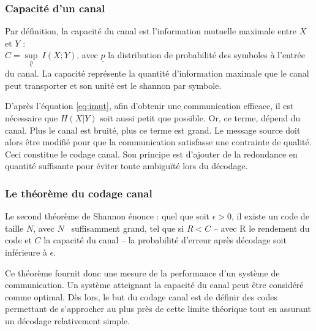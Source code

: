 \subsubsection{Capacité d'un canal}
Par définition, la capacité du canal est l'information mutuelle maximale entre $X$ et $Y$ : \\
$C=\sup\limits_{\underline{p}}\ I(X;Y)$, avec $\underline{p}$ la distribution de probabilité des symboles à l'entrée 
du canal. La capacité représente la quantité d'information maximale que le canal peut transporter et son unité est le 
shannon par symbole.

D'après l'équation \ref{eq:imut}, afin d'obtenir une communication efficace, il est nécessaire que $H(X|Y)$ soit aussi
petit que possible. Or, ce terme, dépend du canal. Plus le canal est bruité, plus ce terme est grand. Le message 
source doit alors être modifié pour que la communication satisfasse une contrainte de qualité. Ceci constitue le codage 
canal. Son principe est d'ajouter de la redondance en quantité suffisante pour éviter toute ambiguïté lors du décodage.

\subsubsection{Le théorème du codage canal}
Le second théorème de Shannon énonce : quel que soit $\epsilon > 0$, il existe un code de taille $N$, avec $N$ \
suffisamment grand, tel que si $R<C$ -- avec R le rendement du code et $C$ la capacité du canal -- la probabilité
d'erreur après décodage soit inférieure à $\epsilon$. 

Ce théorème fournit donc une mesure de la performance d'un système de communication. Un système atteignant la capacité 
du canal peut être considéré comme optimal. Dès lors, le but du codage canal est de définir des codes permettant de 
s'approcher au plus près de cette limite théorique tout en assurant un décodage relativement simple.

